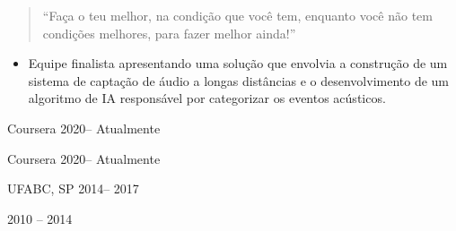
\begin{quote}
	``Faça o teu melhor, na condição que você tem, enquanto você não tem condições melhores, 
	para fazer melhor ainda!''
\end{quote}

\begin{itemize}
			
	\justifying
	\item Equipe finalista apresentando uma solução que envolvia a construção
	      de um sistema de captação de áudio a longas distâncias e o desenvolvimento de um 
	      algoritmo de IA responsável por categorizar os eventos acústicos.
	      	      	        
\end{itemize}



 {Coursera} {2020-- Atualmente}{} 

 {Coursera} {2020-- Atualmente}{} 

 {UFABC, SP} {2014-- 2017}{} 

 {2010 -- 2014}{}


\clearpage
